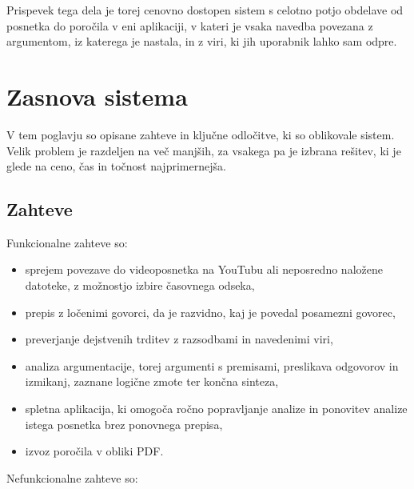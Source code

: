 \documentclass[a4paper, 12pt]{book}
\begin{document}
Prispevek tega dela je torej cenovno dostopen sistem s celotno potjo obdelave od posnetka do poročila v eni aplikaciji, v kateri je vsaka navedba povezana z argumentom, iz katerega je nastala, in z viri, ki jih uporabnik lahko sam odpre.


\chapter{Zasnova sistema}
\label{ch:zasnova}

V tem poglavju so opisane zahteve in ključne odločitve, ki so oblikovale sistem.
Velik problem je razdeljen na več manjših, za vsakega pa je izbrana rešitev, ki
je glede na ceno, čas in točnost najprimernejša.

\section{Zahteve}
\label{sec:zahteve}

Funkcionalne zahteve so:

\begin{itemize}
\item sprejem povezave do videoposnetka na YouTubu ali neposredno naložene
datoteke, z možnostjo izbire časovnega odseka,
\item prepis z ločenimi govorci, da je razvidno, kaj je povedal posamezni
govorec,
\item preverjanje dejstvenih trditev z razsodbami in navedenimi viri,
\item analiza argumentacije, torej argumenti s premisami, preslikava odgovorov
in izmikanj, zaznane logične zmote ter končna sinteza,
\item spletna aplikacija, ki omogoča ročno popravljanje analize in ponovitev
analize istega posnetka brez ponovnega prepisa,
\item izvoz poročila v obliki PDF.
\end{itemize}

Nefunkcionalne zahteve so:
\end{document}
